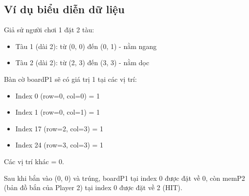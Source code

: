 \subsection{Ví dụ biểu diễn dữ liệu}

Giả sử người chơi 1 đặt 2 tàu:
\begin{itemize}
    \item Tàu 1 (dài 2): từ (0, 0) đến (0, 1) - nằm ngang
    \item Tàu 2 (dài 2): từ (2, 3) đến (3, 3) - nằm dọc
\end{itemize}

Bàn cờ boardP1 sẽ có giá trị 1 tại các vị trí:
\begin{itemize}
    \item Index 0 (row=0, col=0) = 1
    \item Index 1 (row=0, col=1) = 1
    \item Index 17 (row=2, col=3) = 1
    \item Index 24 (row=3, col=3) = 1
\end{itemize}

Các vị trí khác = 0.

Sau khi bắn vào (0, 0) và trúng, boardP1 tại index 0 được đặt về 0, còn memP2 (bản đồ bắn của Player 2) tại index 0 được đặt về 2 (HIT).
